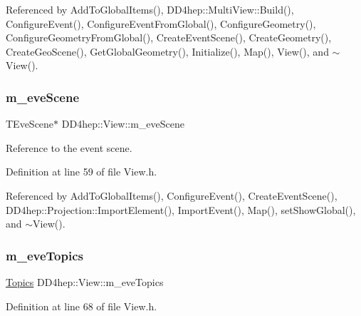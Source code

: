 Referenced by Add\+To\+Global\+Items(), D\+D4hep\+::\+Multi\+View\+::\+Build(), Configure\+Event(), Configure\+Event\+From\+Global(), Configure\+Geometry(), Configure\+Geometry\+From\+Global(), Create\+Event\+Scene(), Create\+Geometry(), Create\+Geo\+Scene(), Get\+Global\+Geometry(), Initialize(), Map(), View(), and $\sim$\+View().

\hypertarget{class_d_d4hep_1_1_view_ae1010f3e7f65ecc82f47cb160a8839c0}{}\label{class_d_d4hep_1_1_view_ae1010f3e7f65ecc82f47cb160a8839c0} 
\subsubsection{\texorpdfstring{m\+\_\+eve\+Scene}{m\_eveScene}}
{\footnotesize\ttfamily T\+Eve\+Scene$\ast$ D\+D4hep\+::\+View\+::m\+\_\+eve\+Scene\hspace{0.3cm}{\ttfamily [protected]}}



Reference to the event scene. 



Definition at line 59 of file View.\+h.



Referenced by Add\+To\+Global\+Items(), Configure\+Event(), Create\+Event\+Scene(), D\+D4hep\+::\+Projection\+::\+Import\+Element(), Import\+Event(), Map(), set\+Show\+Global(), and $\sim$\+View().

\hypertarget{class_d_d4hep_1_1_view_a6d3c5e7719c79fc50b50f575924b5bf5}{}\label{class_d_d4hep_1_1_view_a6d3c5e7719c79fc50b50f575924b5bf5} 
\subsubsection{\texorpdfstring{m\+\_\+eve\+Topics}{m\_eveTopics}}
{\footnotesize\ttfamily \hyperlink{class_d_d4hep_1_1_view_aac8510a8567e5e9128020fd81d8f57de}{Topics} D\+D4hep\+::\+View\+::m\+\_\+eve\+Topics\hspace{0.3cm}{\ttfamily [protected]}}



Definition at line 68 of file View.\+h.

\hypertarget{class_d_d4hep_1_1_view_a26d377786acafb43d0fccf8752d2bd79}{}\label{class_d_d4hep_1_1_view_a26d377786acafb43d0fccf8752d2bd79} 
